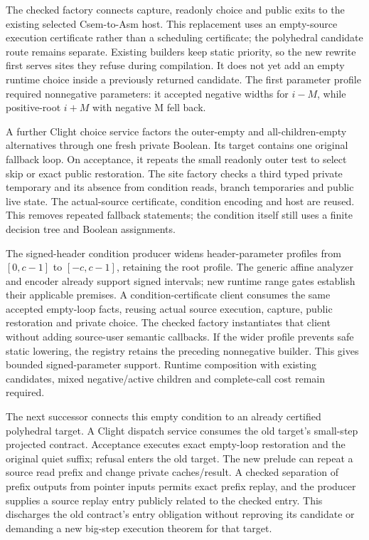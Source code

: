 The checked factory connects capture, readonly choice and public exits to the
existing selected Csem-to-Asm host. This replacement uses an empty-source
execution certificate rather than a scheduling certificate; the polyhedral
candidate route remains separate. Existing builders keep static priority,
so the new rewrite first serves sites they refuse during compilation. It does
not yet add an empty runtime choice inside a previously returned candidate.
The first parameter profile required nonnegative parameters: it accepted
negative widths for $i-M$, while positive-root $i+M$ with negative M fell back.

A further Clight choice service factors the outer-empty and all-children-empty
alternatives through one fresh private Boolean. Its target contains one
original fallback loop. On acceptance, it repeats the small readonly outer
test to select skip or exact public restoration. The site factory checks a
third typed private temporary and its absence from condition reads, branch
temporaries and public live state. The actual-source certificate, condition
encoding and host are reused. This removes repeated fallback statements;
the condition itself still uses a finite decision tree and Boolean assignments.

The signed-header condition producer widens header-parameter profiles from
$[0,c-1]$ to $[-c,c-1]$, retaining the root profile. The generic affine analyzer
and encoder already support signed intervals; new runtime range gates establish
their applicable premises. A condition-certificate client consumes the same
accepted empty-loop facts, reusing actual source execution, capture, public
restoration and private choice. The checked factory instantiates that client
without adding source-user semantic callbacks. If the wider profile prevents
safe static lowering, the registry retains the preceding nonnegative builder.
This gives bounded signed-parameter support. Runtime composition with existing
candidates, mixed negative/active children and complete-call cost remain required.

The next successor connects this empty condition to an already certified
polyhedral target. A Clight dispatch service consumes the old target's
small-step projected contract. Acceptance executes exact empty-loop restoration
and the original quiet suffix; refusal enters the old target. The new prelude
can repeat a source read prefix and change private caches/result. A checked
separation of prefix outputs from pointer inputs permits exact prefix replay,
and the producer supplies a source replay entry publicly related to the checked
entry. This discharges the old contract's entry obligation without reproving its
candidate or demanding a new big-step execution theorem for that target.

